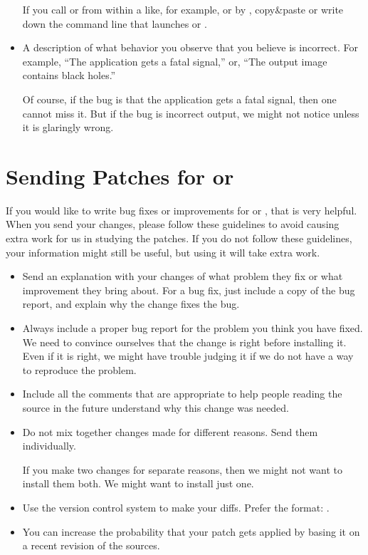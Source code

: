 \begin{itemize}
  If you call \App{} or \OtherApp{} from within a  like, for example,
   or  by , copy\&paste or write down the command line that launches \App{} or \OtherApp{}.

\item
  A description of what behavior you observe that you believe is incorrect.  For example, ``The
  application gets a fatal signal,'' or, ``The output image contains black holes.''

  Of course, if the bug is that the application gets a fatal signal, then one cannot miss it.
  But if the bug is incorrect output, we might not notice unless it is glaringly wrong.
\end{itemize}


\section[Sending Patches]{\label{sec:sending-patches}%
  Sending Patches for \App{} or \OtherApp{}}

If you would like to write bug fixes or improvements for \App{} or \OtherApp{}, that is very
helpful.  When you send your changes, please follow these guidelines to avoid causing extra work
for us in studying the patches.  If you do not follow these guidelines, your information might
still be useful, but using it will take extra work.

\begin{itemize}
\item
  Send an explanation with your changes of what problem they fix or what improvement they bring
  about.  For a bug fix, just include a copy of the bug report, and explain why the change fixes
  the bug.

\item
  Always include a proper bug report for the problem you think you have fixed.  We need to
  convince ourselves that the change is right before installing it.  Even if it is right, we
  might have trouble judging it if we do not have a way to reproduce the problem.

\item
  Include all the comments that are appropriate to help people reading the source in the future
  understand why this change was needed.

\item
  Do not mix together changes made for different reasons.  Send them individually.

  If you make two changes for separate reasons, then we might not want to install them both.  We
  might want to install just one.

\item
  Use the version control system to make your diffs.  Prefer the
   format: .

\item
  You can increase the probability that your patch gets applied by basing it on a recent
  revision of the sources.
\end{itemize}



